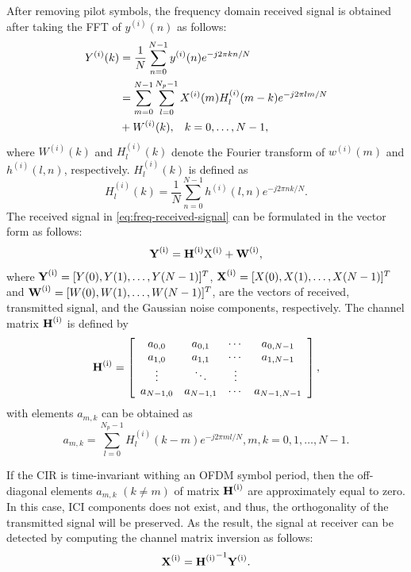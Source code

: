 \documentclass[12pt,journal,draftclsnofoot,onecolumn]{IEEEtran}
\begin{document}
After removing pilot symbols, the frequency domain received signal is obtained after taking the FFT of $y^{(i)}(n)$ as follows:
%
\begin{equation}\label{eq:freq-received-signal}
	\begin{split}
	Y^{(i)}(k)&=\dfrac{1}{N} \sum_{n=0}^{N-1} y^{(i)}(n)e^{-j2\pi kn/N}\qquad\\
	&= \sum_{m=0}^{N-1}\sum_{l=0}^{N_p-1} X^{(i)}(m)H^{(i)}_{l}(m-k) e^{-j2\pi lm/N}  \\
	& + W^{(i)}(k), \hspace{0.3cm}k=0,\dots,N-1,
	\end{split}
\end{equation} 
%
where $W^{(i)}(k)$ and $H^{(i)}_l(k)$ denote the Fourier transform of $w^{(i)}(m)$ and $h^{(i)}(l,n)$, respectively. $H^{(i)}_{l}(k)$ is defined as
%
\begin{equation}\label{eq:fft-of-CIR}
	H^{(i)}_{l}(k)=\frac{1}{N} \sum_{n=0}^{N-1} h^{(i)}(l,n)e^{-j2\pi nk/N}.
\end{equation}
%
The received signal in \eqref{eq:freq-received-signal} can be formulated in the vector form as follows:
%
\begin{equation}\label{eq:vector-sinal}
	\rm {\textbf Y^{(i)}}= \rm{\textbf H^{(i)} X^{(i)}} +\rm {\textbf W^{(i)}}, 
\end{equation}
%
where ${\rm{\textbf Y^{(i)}}}=[Y(0),Y(1), \dots,Y(N-1)]^{T}$,  ${\rm {\textbf X^{(i)}}} =[X(0), X(1), \dots,X(N-1)]^{T}$ and  ${\rm {\textbf W^{(i)}}}=[W(0),W(1), \dots, W(N-1)]^{T}$, are the vectors of received, transmitted signal, and the Gaussian noise components, respectively. The channel matrix $\rm{\textbf H^{(i)}}$ is defined by
%
\begin{equation}\label{eq:matrix-channel}
	\rm{\textbf H^{(i)}}=\left[\begin{array}{cccc}
	a_{0,0}& a_{0,1} &  \cdots &  a_{0,N-1} \\
	a_{1,0}&  a_{1,1}&  \cdots &  a_{1,N-1}  \\
	\vdots &  \ddots&  \vdots \\
	a_{N-1,0}&  a_{N-1,1}&  \cdots &  a_{N-1,N-1}
	\end{array}\right],
\end{equation}
%
with elements $a_{m,k}$ can be obtained as 
%
\begin{equation*}
a_{m,k}=\sum_{l=0}^{N_p-1}H^{(i)}_l(k-m) e^{-j2\pi ml/N},m,k=0,1,\dots,N-1.
\end{equation*}
%
	
If the CIR is time-invariant withing an OFDM symbol period, then the off-diagonal elements $a_{m,k}$ $(k\neq m)$ of matrix $\rm{\textbf H^{(i)}}$ are approximately equal to zero. In this case, ICI components does not exist, and thus, the orthogonality of the transmitted signal will be preserved. As the result, the signal at receiver can be detected by computing the channel matrix inversion as follows:
%
\begin{equation}\label{eq:matrix-inverse}
\rm {\textbf X^{(i)}}= \rm {\textbf H^{(i)}}^{-1}{\rm {\textbf Y^{(i)}}}.
\end{equation}
%
	
\end{document}
